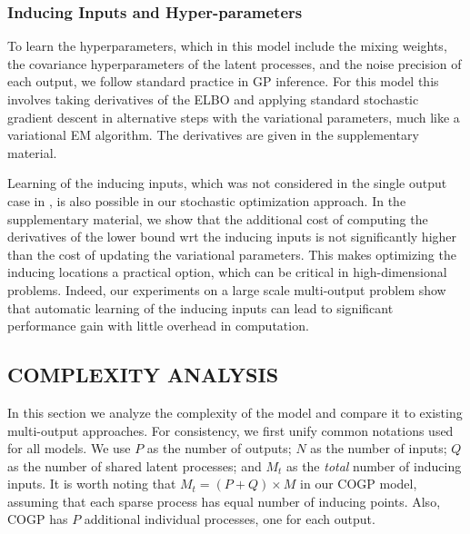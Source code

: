 \subsubsection{Inducing Inputs and Hyper-parameters \label{sec:hyperparameters}}
To learn the hyperparameters, which in this model include the mixing weights, the covariance hyperparameters of the latent processes, and the noise precision of each output, we follow standard practice in GP inference.
For this model this involves taking derivatives of the ELBO and applying standard stochastic gradient descent in alternative steps with the variational parameters, much like a variational EM algorithm. 
The derivatives are given in the supplementary material.

Learning of the inducing inputs, which was not considered in the single output case in \citet{hensmangaussian}, is also possible in our stochastic optimization approach.
In the supplementary material, we show that 
the additional cost of computing the derivatives of the lower bound wrt the inducing inputs is not significantly 
higher than the cost of updating the variational parameters.
This makes optimizing the inducing locations a practical option, which can be critical 
in high-dimensional problems. %
Indeed, our experiments on a large scale multi-output problem show that automatic learning of the inducing inputs can lead to significant performance gain with little overhead in computation. 
%
\subsection{COMPLEXITY ANALYSIS \label{sec:complexity}}
In this section we analyze the complexity of the model and compare it to existing multi-output approaches.
For consistency, we first unify common notations used for all models.
We use $P$ as the number of outputs; $N$ as the number of inputs; $Q$ as the number of shared latent processes; and $M_t$ as the \emph{total} number of inducing inputs.
It is worth noting that $M_t = (P + Q) \times M$ in our COGP model, assuming that each sparse process has equal number of inducing points. 
Also, COGP has $P$ additional individual processes, one for each output.

